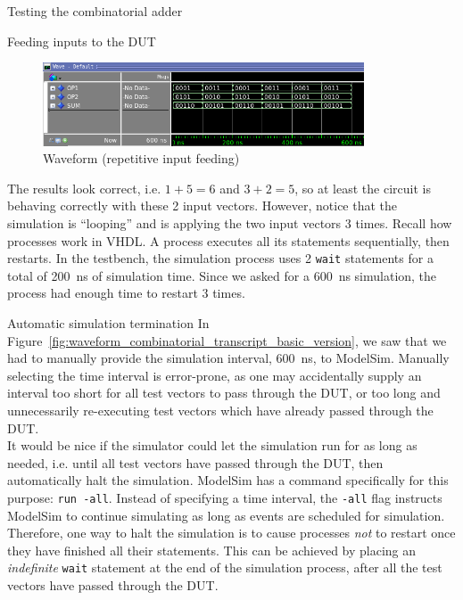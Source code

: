 \documentclass[lab]{course}
\begin{document}
\begin{section}{Testing the combinatorial adder}
\begin{subsection}{Feeding inputs to the DUT}
\begin{enumerate}
            \begin{figure}[!h]
                \begin{centering}
                    \includegraphics[width=0.85\textwidth]{figs/waveform_combinatorial_process_reexecutes.png}
                    \caption{Waveform (repetitive input feeding)}
                    \label{fig:waveform_combinatorial_process_reexecutes}
                \end{centering}
            \end{figure}

            The results look correct, i.e. $1 + 5 = 6$ and $3 + 2 = 5$, so at least the circuit is behaving correctly with these 2 input vectors. However, notice that the simulation is ``looping'' and is applying the two input vectors 3 times. Recall how processes work in VHDL. A process executes all its statements sequentially, then restarts. In the testbench, the simulation process uses 2 \verb+wait+ statements for a total of \SI{200}{\nano\second} of simulation time. Since we asked for a \SI{600}{\nano\second} simulation, the process had enough time to restart 3 times.
        \end{enumerate}

        \clearpage

        \begin{subsubsection}{Automatic simulation termination}
            In Figure~\ref{fig:waveform_combinatorial_transcript_basic_version}, we saw that we had to manually provide the simulation interval, \SI{600}{\nano\second}, to ModelSim. Manually selecting the time interval is error-prone, as one may accidentally supply an interval too short for all test vectors to pass through the DUT, or too long and unnecessarily re-executing test vectors which have already passed through the DUT. \\

            It would be nice if the simulator could let the simulation run for as long as needed, i.e. until all test vectors have passed through the DUT, then automatically halt the simulation. ModelSim has a command specifically for this purpose: \verb+run -all+. Instead of specifying a time interval, the \verb+-all+ flag instructs ModelSim to continue simulating as long as events are scheduled for simulation. Therefore, one way to halt the simulation is to cause processes \emph{not} to restart once they have finished all their statements. This can be achieved by placing an \emph{indefinite} \verb+wait+ statement at the end of the simulation process, after all the test vectors have passed through the DUT.


\end{subsubsection}
\end{subsection}
\end{section}
\end{document}
